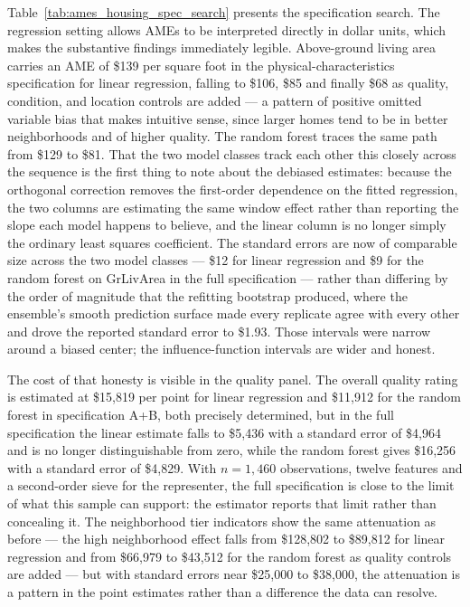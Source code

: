 \documentclass[12pt]{article}
\begin{document}
	Table~\ref{tab:ames_housing_spec_search} presents the specification search. The regression setting allows AMEs to be interpreted directly in dollar units, which makes the substantive findings immediately legible. Above-ground living area carries an AME of \$139 per square foot in the physical-characteristics specification for linear regression, falling to \$106, \$85 and finally \$68 as quality, condition, and location controls are added --- a pattern of positive omitted variable bias that makes intuitive sense, since larger homes tend to be in better neighborhoods and of higher quality. The random forest traces the same path from \$129 to \$81. That the two model classes track each other this closely across the sequence is the first thing to note about the debiased estimates: because the orthogonal correction removes the first-order dependence on the fitted regression, the two columns are estimating the same window effect rather than reporting the slope each model happens to believe, and the linear column is no longer simply the ordinary least squares coefficient. The standard errors are now of comparable size across the two model classes --- \$12 for linear regression and \$9 for the random forest on GrLivArea in the full specification --- rather than differing by the order of magnitude that the refitting bootstrap produced, where the ensemble's smooth prediction surface made every replicate agree with every other and drove the reported standard error to \$1.93. Those intervals were narrow around a biased center; the influence-function intervals are wider and honest.

	The cost of that honesty is visible in the quality panel. The overall quality rating is estimated at \$15,819 per point for linear regression and \$11,912 for the random forest in specification A+B, both precisely determined, but in the full specification the linear estimate falls to \$5,436 with a standard error of \$4,964 and is no longer distinguishable from zero, while the random forest gives \$16,256 with a standard error of \$4,829. With $n = 1{,}460$ observations, twelve features and a second-order sieve for the representer, the full specification is close to the limit of what this sample can support: the estimator reports that limit rather than concealing it. The neighborhood tier indicators show the same attenuation as before --- the high neighborhood effect falls from \$128,802 to \$89,812 for linear regression and from \$66,979 to \$43,512 for the random forest as quality controls are added --- but with standard errors near \$25{,}000 to \$38{,}000, the attenuation is a pattern in the point estimates rather than a difference the data can resolve.
	
\end{document}
